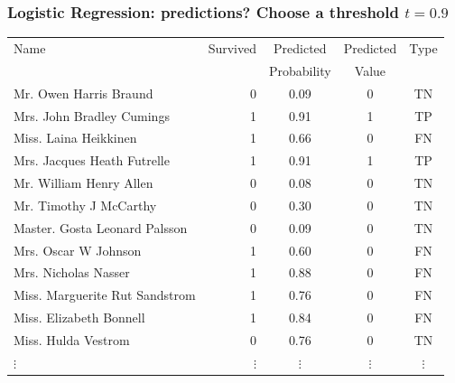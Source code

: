 \documentclass[aspectratio=169]{beamer}
\theoremstyle{principle}
\begin{document}
\begin{frame}
\frametitle{Logistic Regression: predictions?  Choose a threshold $t = 0.9$}

\begin{table}[ht]
\centering
\begin{tabular}{l | r | c | c | c}

 Name & Survived & Predicted & Predicted & Type\\ 
&&Probability&Value\\
  \hline
  \hline
 Mr. Owen Harris Braund &   0 & 0.09 & 0 & TN\\ 
 Mrs. John Bradley Cumings &   1 & 0.91 & 1 & TP\\ 
 Miss. Laina Heikkinen &   1 & 0.66 & 0 & FN\\ 
 Mrs. Jacques Heath Futrelle &   1 & 0.91 & 1 & TP\\ 
 Mr. William Henry Allen &   0 & 0.08 & 0 & TN\\ 
 Mr. Timothy J McCarthy &   0 & 0.30 & 0 & TN\\ 
 Master. Gosta Leonard Palsson &   0 & 0.09 & 0 & TN\\ 
 Mrs. Oscar W Johnson &   1 & 0.60 & 0 & FN\\ 
 Mrs. Nicholas Nasser &   1 & 0.88 & 0 & FN\\ 
 Miss. Marguerite Rut Sandstrom &   1 & 0.76 & 0 & FN\\ 
 Miss. Elizabeth Bonnell &   1 & 0.84 &0 & FN\\ 
 Miss. Hulda Vestrom &   0 & 0.76 &0 & TN\\ 
$\vdots$ & $\vdots$ & $\vdots$ & $\vdots$ & $\vdots$
\end{tabular}
\end{table}

\end{frame}
\end{document}
